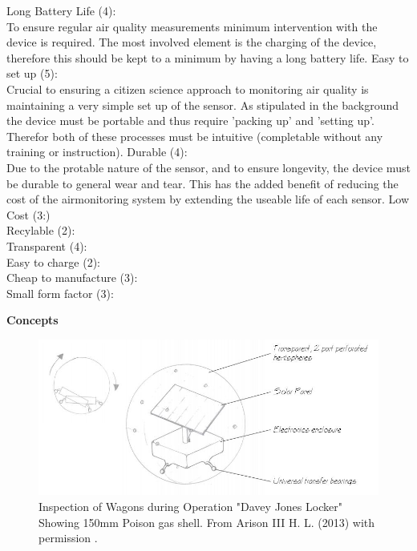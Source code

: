 Long Battery Life (4):\\
To ensure regular air quality measurements minimum intervention with the device is required. The most involved element is the charging of the device, therefore this should be kept to a minimum by having a long battery life.
\vskip 0.1in
Easy to set up (5):\\
Crucial to ensuring a citizen science approach to monitoring air quality is maintaining a very simple set up of the sensor. As stipulated in the background the device must be portable and thus require 'packing up' and 'setting up'. Therefor both of these processes must be intuitive (completable without any training or instruction).
\vskip 0.1in
Durable (4):\\
Due to the protable nature of the sensor, and to ensure longevity, the device must be durable to general wear and tear. This has the added benefit of reducing the cost of the airmonitoring system by extending the useable life of each sensor.
\vskip 0.1in
Low Cost (3:)\\
\vskip 0.1in
Recylable (2):\\
\vskip 0.1in
Transparent (4):\\
\vskip 0.1in
Easy to charge (2):\\
\vskip 0.1in
Cheap to manufacture (3):\\
\vskip 0.1in
Small form factor (3):\\
\vskip 0.1in

\textbf{Concepts}\\

\begin{figure}[H]
\centering
\includegraphics[width=0.9\linewidth]{Engineering_hardware/Engineering_hardware_Figures/Concept_ball.JPG}
\caption{Inspection of Wagons during Operation "Davey Jones Locker" Showing 150mm Poison gas shell. From Arison III H. L. (2013) with permission \cite{arison2014european}.  }
\label{fig:15cm_shell_loading}
\end{figure}



